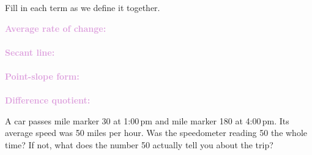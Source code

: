 \documentclass[10pt]{article}
\begin{document}

\vspace{0.12in}

\boxguard
\begin{vocabbox}
Fill in each term as we define it together.
\par\vspace{2pt}
\noindent\textbf{\textcolor{plum}{Average rate of change:}}\\[1pt]
\writeline\\[3pt]
\noindent\textbf{\textcolor{plum}{Secant line:}}\\[1pt]
\writeline\\[3pt]
\noindent\textbf{\textcolor{plum}{Point-slope form:}}\\[1pt]
\writeline\\[3pt]
\noindent\textbf{\textcolor{plum}{Difference quotient:}}\\[1pt]
\writeline
\end{vocabbox}

\vspace{0.1in}

\boxguard
\begin{hookbox}
A car passes mile marker 30 at 1:00\,pm and mile marker 180 at 4:00\,pm. Its average speed
was 50 miles per hour. Was the speedometer reading 50 the whole time? If not, what does the
number 50 actually tell you about the trip?
\end{hookbox}
\end{document}
